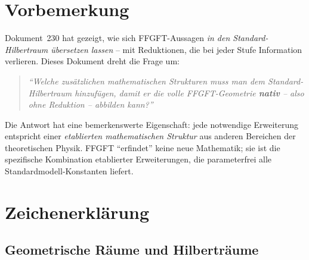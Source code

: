 
\section*{Vorbemerkung}

Dokument~230 hat gezeigt, wie sich FFGFT-Aussagen \emph{in den
Standard-Hilbertraum übersetzen lassen} -- mit Reduktionen, die bei
jeder Stufe Information verlieren. Dieses Dokument dreht die
Frage um:

\begin{quote}
\itshape
\enquote{Welche zusätzlichen mathematischen Strukturen muss man dem
Standard-Hilbertraum hinzufügen, damit er die volle FFGFT-Geometrie
\textbf{nativ} -- also ohne Reduktion -- abbilden kann?}
\end{quote}

Die Antwort hat eine bemerkenswerte Eigenschaft: jede notwendige
Erweiterung entspricht einer \emph{etablierten mathematischen
Struktur} aus anderen Bereichen der theoretischen Physik. FFGFT
\enquote{erfindet} keine neue Mathematik; sie ist die spezifische
Kombination etablierter Erweiterungen, die parameterfrei alle
Standardmodell-Konstanten liefert.

\section*{Zeichenerklärung}

\subsection*{Geometrische Räume und Hilberträume}

